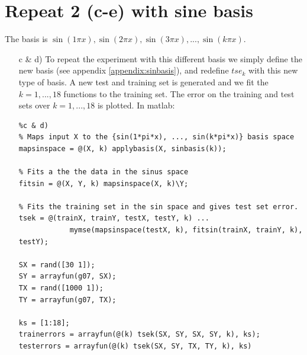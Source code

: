 \documentclass[11pt]{article}
\begin{document}
\section{Repeat 2 (c-e) with sine basis}
    The basis is $\sin( 1 \pi x), \sin( 2 \pi x), \sin(3 \pi x), . . . , \sin(k \pi x)$.

\begin{itemize}
    \item[c \& d)] To repeat the experiment with this different basis we simply define the new basis (see appendix \ref{appendix:sinbasis}), and redefine $tse_k$ with this new type of basis. A new test and training set is generated and we fit the $k=1, ..., 18$ functions to the training set. The error on the training and test sets over $k=1, ..., 18$ is plotted. In matlab:
    \begin{lstlisting}
%c & d)
% Maps input X to the {sin(1*pi*x), ..., sin(k*pi*x)} basis space
mapsinspace = @(X, k) applybasis(X, sinbasis(k));

% Fits a the the data in the sinus space
fitsin = @(X, Y, k) mapsinspace(X, k)\Y;

% Fits the training set in the sin space and gives test set error.
tsek = @(trainX, trainY, testX, testY, k) ...
            mymse(mapsinspace(testX, k), fitsin(trainX, trainY, k), testY);

SX = rand([30 1]);
SY = arrayfun(g07, SX);
TX = rand([1000 1]);
TY = arrayfun(g07, TX);

ks = [1:18];
trainerrors = arrayfun(@(k) tsek(SX, SY, SX, SY, k), ks);
testerrors = arrayfun(@(k) tsek(SX, SY, TX, TY, k), ks)


\end{lstlisting}
\end{itemize}
\end{document}
